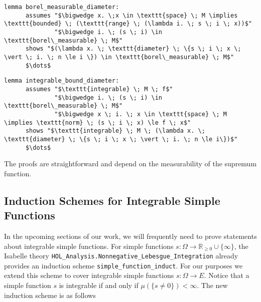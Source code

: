\begin{isalemma}
{\small
	\begin{lstlisting}[style=isabelle]
	lemma borel_measurable_diameter: 
	  assumes "$\bigwedge x. \;x \in \texttt{space} \; M \implies \texttt{bounded} \; (\texttt{range} \; (\lambda i. \; s \; i \; x))$"
			  "$\bigwedge i. \; (s \; i) \in \texttt{borel\_measurable} \; M$"
	  shows "$(\lambda x. \; \texttt{diameter} \; \{s \; i \; x \; \vert \; i. \; n \le i \}) \in \texttt{borel\_measurable} \; M$"
	  $\dots$
  	\end{lstlisting}
}
\end{isalemma}

\begin{isalemma}
{\small
	\begin{lstlisting}[style=isabelle]
	lemma integrable_bound_diameter: 
	  assumes "$\texttt{integrable} \; M \; f$" 
			  "$\bigwedge i. \; (s \; i) \in \texttt{borel\_measurable} \; M$"
			  "$\bigwedge x \; i. \; x \in \texttt{space} \; M \implies \texttt{norm} \; (s \; i \; x) \le f \; x$"
	  shows "$\texttt{integrable} \; M \; (\lambda x. \; \texttt{diameter} \; \{s \; i \; x \; \vert \; i. \; n \le i\})$"
	  $\dots$
  	\end{lstlisting}
}
\end{isalemma}

The proofs are straightforward and depend on the measurability of the supremum function.

\subsection{Induction Schemes for Integrable Simple Functions}

In the upcoming sections of our work, we will frequently need to prove statements about integrable simple functions. For simple functions $s : \Omega \rightarrow \mathbb{R}_{\ge 0} \cup \{\infty\}$, the Isabelle theory \texttt{HOL\_Analysis.Nonnegative\_Lebesgue\_Integration} already provides an induction scheme \texttt{simple\_function\_induct}. For our purposes we extend this scheme to cover integrable simple functions $s : \Omega \rightarrow E$. Notice that a simple function $s$ is integrable if and only if $\mu(\{s \neq 0\}) < \infty$. The new induction scheme is as follows

